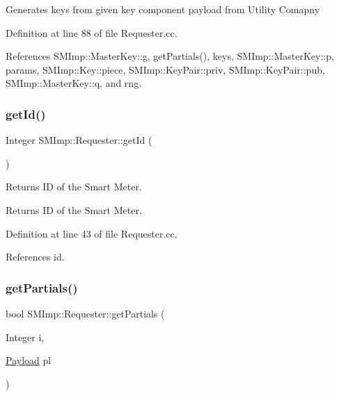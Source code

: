 Generates keys from given key component payload from Utility Comapny 

Definition at line 88 of file Requester.\+cc.



References S\+M\+Imp\+::\+Master\+Key\+::g, get\+Partials(), keys, S\+M\+Imp\+::\+Master\+Key\+::p, params, S\+M\+Imp\+::\+Key\+::piece, S\+M\+Imp\+::\+Key\+Pair\+::priv, S\+M\+Imp\+::\+Key\+Pair\+::pub, S\+M\+Imp\+::\+Master\+Key\+::q, and rng.

\mbox{\label{classSMImp_1_1Requester_aab47f28abff18bff606b09a6f08b777f}} 
\subsubsection{\texorpdfstring{get\+Id()}{getId()}}
{\footnotesize\ttfamily Integer S\+M\+Imp\+::\+Requester\+::get\+Id (\begin{DoxyParamCaption}{ }\end{DoxyParamCaption})}

Returns ID of the Smart Meter. \begin{DoxyReturn}{Returns}
ID of the Smart Meter. 
\end{DoxyReturn}


Definition at line 43 of file Requester.\+cc.



References id.

\mbox{\label{classSMImp_1_1Requester_aeba5d66cc755813cf8a7ae07c6800afe}} 
\subsubsection{\texorpdfstring{get\+Partials()}{getPartials()}}
{\footnotesize\ttfamily bool S\+M\+Imp\+::\+Requester\+::get\+Partials (\begin{DoxyParamCaption}\item[{Integer}]{i,  }\item[{\hyperlink{structSMImp_1_1Payload}{Payload}}]{pl }\end{DoxyParamCaption})}

